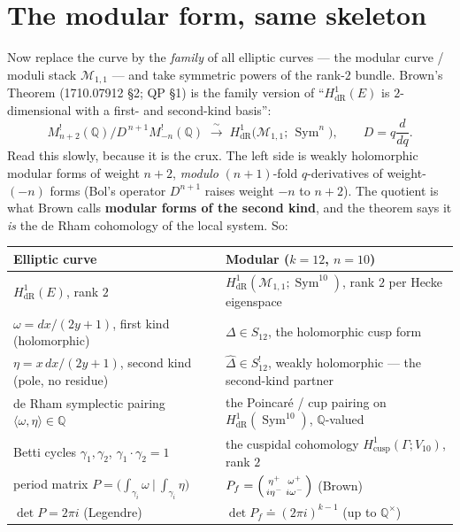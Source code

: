 \documentclass[11pt]{article}
\newcommand{\QQ}{\mathbb{Q}}
\newcommand{\Dhat}{\widehat{\Delta}}
\newcommand{\HdR}{H^1_{\mathrm{dR}}}
\DeclareMathOperator{\Sym}{Sym}
\begin{document}
\section{The modular form, same skeleton}

Now replace the curve by the \emph{family} of all elliptic curves --- the
modular curve / moduli stack $\mathcal{M}_{1,1}$ --- and take symmetric
powers of the rank-$2$ bundle. Brown's Theorem (1710.07912 §2; QP §1) is
the family version of ``$\HdR(E)$ is $2$-dimensional with a first- and
second-kind basis'':
\[
  M^!_{n+2}(\QQ)\big/ D^{\,n+1} M^!_{-n}(\QQ)
  \;\xrightarrow{\ \sim\ }\;
  \HdR\!\big(\mathcal{M}_{1,1};\, \Sym^n\big),
  \qquad D = q\frac{d}{dq}.
\]
Read this slowly, because it is the crux. The left side is weakly
holomorphic modular forms of weight $n+2$, \emph{modulo} $(n{+}1)$-fold
$q$-derivatives of weight-$(-n)$ forms (Bol's operator $D^{n+1}$ raises
weight $-n$ to $n+2$). The quotient is what Brown calls \textbf{modular
forms of the second kind}, and the theorem says it \emph{is} the de Rham
cohomology of the local system. So:
\begin{center}
\begin{tabular}{>{\raggedright}p{} >{\raggedright\arraybackslash}p{}}
\textbf{Elliptic curve} & \textbf{Modular ($k=12$, $n=10$)}\\
\hline
$\HdR(E)$, rank $2$ &
$\HdR(\mathcal{M}_{1,1}; \Sym^{10})$, rank $2$ per Hecke eigenspace\\[4pt]
$\omega = dx/(2y{+}1)$, first kind (holomorphic) &
$\Delta \in S_{12}$, the holomorphic cusp form\\[4pt]
$\eta = x\,dx/(2y{+}1)$, second kind (pole, no residue) &
$\Dhat \in S^!_{12}$, weakly holomorphic --- the second-kind partner\\[4pt]
de Rham symplectic pairing $\langle\omega,\eta\rangle \in \QQ$ &
the Poincar\'e / cup pairing on $\HdR(\Sym^{10})$, $\QQ$-valued\\[4pt]
Betti cycles $\gamma_1, \gamma_2$, $\gamma_1\cdot\gamma_2 = 1$ &
the cuspidal cohomology $H^1_{\mathrm{cusp}}(\Gamma; V_{10})$, rank $2$\\[4pt]
period matrix $P = \big(\int_{\gamma_i}\omega \ \big|\ \int_{\gamma_i}\eta\big)$ &
$P_f = \begin{psmallmatrix} \eta^+ & \omega^+ \\ i\eta^- & i\omega^- \end{psmallmatrix}$ (Brown)\\[8pt]
$\det P = 2\pi i$ (Legendre) &
$\det P_f \doteq (2\pi i)^{k-1}$ (up to $\QQ^\times$)\\
\end{tabular}
\end{center}
\end{document}
